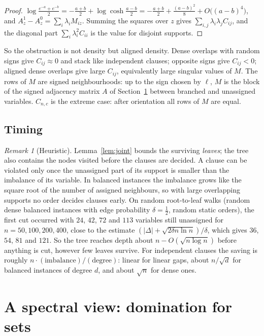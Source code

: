 \documentclass[11pt,a4paper]{article}
\theoremstyle{remark}
\newtheorem{remark}[theorem]{Remark}
\begin{document}
\begin{proof}
$\log\frac{e^{-a}+e^{-b}}2=-\frac{a+b}2+\log\cosh\frac{a-b}2
=-\frac{a+b}2+\frac{(a-b)^2}8+O\bigl((a-b)^4\bigr)$, and
$A^1_z-A^0_z=\sum_i\lambda_iM_{iz}$. Summing the squares over $z$ gives
$\sum_{i,j}\lambda_i\lambda_jC_{ij}$, and the diagonal part
$\sum_i\lambda_i^2C_{ii}$ is the value for disjoint supports.
\end{proof}

So the obstruction is not density but aligned density. Dense overlaps with
random signs give $C_{ij}\approx0$ and stack like independent clauses;
opposite signs give $C_{ij}<0$; aligned dense overlaps give large $C_{ij}$,
equivalently large singular values of $M$. The rows of $M$ are signed
neighbourhoods: up to the sign chosen by $\ell$, $M$ is the block of the signed
adjacency matrix $A$ of Section~\ref{sec:spectral} between branched and
unassigned variables. $C_{n,c}$ is the extreme case: after orientation all rows
of $M$ are equal.

\subsection{Timing}

\begin{remark}[Heuristic]\label{rem:timing}
Lemma~\ref{lem:joint} bounds the surviving \emph{leaves}; the tree also
contains the nodes visited before the clauses are decided. A clause can be
violated only once the unassigned part of its support is smaller than the
imbalance of its variable. In balanced instances the imbalance grows like the
square root of the number of assigned neighbours, so with large overlapping
supports no order decides clauses early. On random root-to-leaf walks (random
dense balanced instances with edge probability $\delta=\frac12$, random static
orders), the first cut occurred with $24$, $42$, $72$ and $113$ variables still
unassigned for $n=50,100,200,400$, close to the estimate
$(|\Delta|+\sqrt{2\delta n\ln n})/\delta$, which gives $36$, $54$, $81$ and
$121$. So the tree reaches depth about $n-O(\sqrt{n\log n})$ before anything is
cut, however few leaves survive. For independent clauses the saving is roughly
$n\cdot(\text{imbalance})/(\text{degree})$: linear for linear gaps, about
$n/\sqrt d$ for balanced instances of degree $d$, and about $\sqrt n$ for dense
ones.
\end{remark}

\section{A spectral view: domination for sets}\label{sec:spectral}
\end{document}
